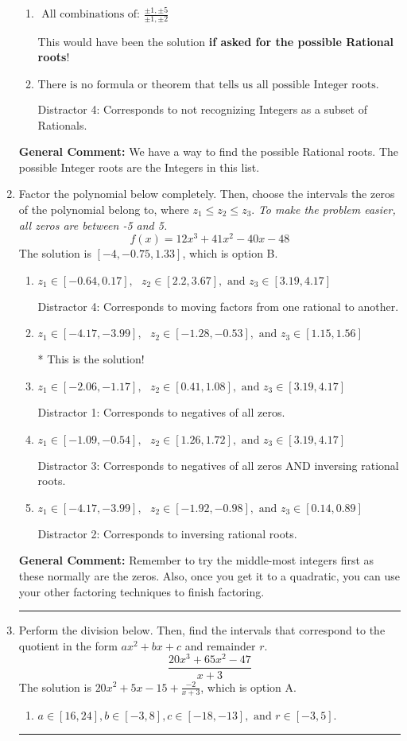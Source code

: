 \documentclass{extbook}[14pt]
\newcommand{\litem}[1]{\item #1

\rule{\textwidth}{0.4pt}}
\begin{document}
\begin{enumerate}
{\begin{enumerate}[label=\Alph*.]
 Distractor 3: Corresponds to the plus or minus of the inverse quotient (an/a0) of the factors. 
\item \( \text{ All combinations of: }\frac{\pm 1,\pm 5}{\pm 1,\pm 2} \)

This would have been the solution \textbf{if asked for the possible Rational roots}!
\item \( \text{There is no formula or theorem that tells us all possible Integer roots.} \)

 Distractor 4: Corresponds to not recognizing Integers as a subset of Rationals.
\end{enumerate}

\textbf{General Comment:} We have a way to find the possible Rational roots. The possible Integer roots are the Integers in this list.
}
\litem{
Factor the polynomial below completely. Then, choose the intervals the zeros of the polynomial belong to, where $z_1 \leq z_2 \leq z_3$. \textit{To make the problem easier, all zeros are between -5 and 5.}
\[ f(x) = 12x^{3} +41 x^{2} -40 x -48 \]The solution is \( [-4, -0.75, 1.33] \), which is option B.\begin{enumerate}[label=\Alph*.]
\item \( z_1 \in [-0.64, 0.17], \text{   }  z_2 \in [2.2, 3.67], \text{   and   } z_3 \in [3.19, 4.17] \)

 Distractor 4: Corresponds to moving factors from one rational to another.
\item \( z_1 \in [-4.17, -3.99], \text{   }  z_2 \in [-1.28, -0.53], \text{   and   } z_3 \in [1.15, 1.56] \)

* This is the solution!
\item \( z_1 \in [-2.06, -1.17], \text{   }  z_2 \in [0.41, 1.08], \text{   and   } z_3 \in [3.19, 4.17] \)

 Distractor 1: Corresponds to negatives of all zeros.
\item \( z_1 \in [-1.09, -0.54], \text{   }  z_2 \in [1.26, 1.72], \text{   and   } z_3 \in [3.19, 4.17] \)

 Distractor 3: Corresponds to negatives of all zeros AND inversing rational roots.
\item \( z_1 \in [-4.17, -3.99], \text{   }  z_2 \in [-1.92, -0.98], \text{   and   } z_3 \in [0.14, 0.89] \)

 Distractor 2: Corresponds to inversing rational roots.
\end{enumerate}

\textbf{General Comment:} Remember to try the middle-most integers first as these normally are the zeros. Also, once you get it to a quadratic, you can use your other factoring techniques to finish factoring.
}
\litem{
Perform the division below. Then, find the intervals that correspond to the quotient in the form $ax^2+bx+c$ and remainder $r$.
\[ \frac{20x^{3} +65 x^{2} -47}{x + 3} \]The solution is \( 20x^{2} +5 x -15 + \frac{-2}{x + 3} \), which is option A.\begin{enumerate}[label=\Alph*.]
\item \( a \in [16, 24], b \in [-3, 8], c \in [-18, -13], \text{ and } r \in [-3, 5]. \)


\end{enumerate}}
\end{enumerate}
\end{document}
